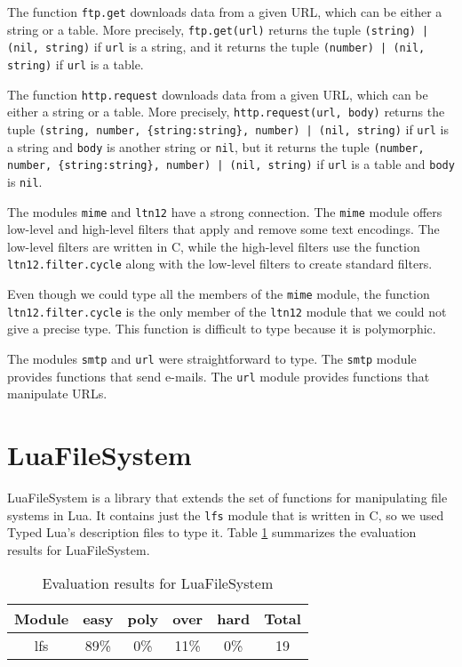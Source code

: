 The function \texttt{ftp.get} downloads data from a given URL,
which can be either a string or a table.
More precisely, \texttt{ftp.get(url)} returns the tuple
\texttt{(string) | (nil, string)} if \texttt{url} is a string,
and it returns the tuple \texttt{(number) | (nil, string)} if
\texttt{url} is a table.

The function \texttt{http.request} downloads data from a given URL,
which can be either a string or a table.
More precisely, \texttt{http.request(url, body)} returns the tuple
\texttt{(string, number, \{string:string\}, number) | (nil, string)}
if \texttt{url} is a string and \texttt{body} is another string or \texttt{nil},
but it returns the tuple
\texttt{(number, number, \{string:string\}, number) | (nil, string)}
if \texttt{url} is a table and \texttt{body} is \texttt{nil}.

The modules \texttt{mime} and \texttt{ltn12} have a strong connection.
The \texttt{mime} module offers low-level and high-level filters
that apply and remove some text encodings.
The low-level filters are written in C, while the high-level filters
use the function \texttt{ltn12.filter.cycle} along with the low-level
filters to create standard filters.

Even though we could type all the members of the \texttt{mime} module,
the function \texttt{ltn12.filter.cycle} is the only member of the
\texttt{ltn12} module that we could not give a precise type.
This function is difficult to type because it is polymorphic.

The modules \texttt{smtp} and \texttt{url} were straightforward to type.
The \texttt{smtp} module provides functions that send e-mails.
The \texttt{url} module provides functions that manipulate URLs.

\section{LuaFileSystem}

LuaFileSystem is a library that extends the set of functions
for manipulating file systems in Lua.
It contains just the \texttt{lfs} module that is written in C,
so we used Typed Lua's description files to type it.
Table \ref{tab:evallfs} summarizes the evaluation results for LuaFileSystem.

\begin{table}[!ht]
\begin{center}
\begin{tabular}{|c|c|c|c|c|c|}
\hline
\textbf{Module} & \textbf{easy} & \textbf{poly} & \textbf{over} & \textbf{hard} & \textbf{Total} \\
\hline
lfs & 89\% & 0\% & 11\% & 0\% & 19 \\ %
\hline
\end{tabular}
\end{center}
\caption{Evaluation results for LuaFileSystem}
\label{tab:evallfs}
\end{table}

